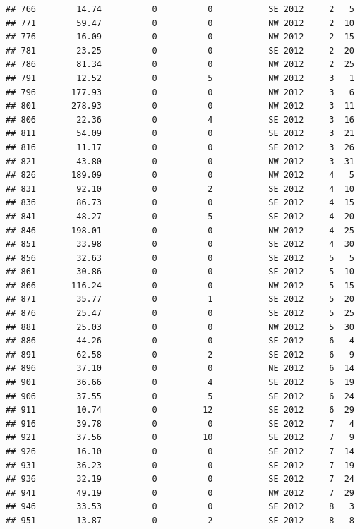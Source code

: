 \documentclass[
]{article}
\begin{document}
\begin{verbatim}
## 766        14.74          0          0           SE 2012     2   5
## 771        59.47          0          0           NW 2012     2  10
## 776        16.09          0          0           NW 2012     2  15
## 781        23.25          0          0           SE 2012     2  20
## 786        81.34          0          0           NW 2012     2  25
## 791        12.52          0          5           NW 2012     3   1
## 796       177.93          0          0           NW 2012     3   6
## 801       278.93          0          0           NW 2012     3  11
## 806        22.36          0          4           SE 2012     3  16
## 811        54.09          0          0           SE 2012     3  21
## 816        11.17          0          0           SE 2012     3  26
## 821        43.80          0          0           NW 2012     3  31
## 826       189.09          0          0           NW 2012     4   5
## 831        92.10          0          2           SE 2012     4  10
## 836        86.73          0          0           SE 2012     4  15
## 841        48.27          0          5           SE 2012     4  20
## 846       198.01          0          0           NW 2012     4  25
## 851        33.98          0          0           SE 2012     4  30
## 856        32.63          0          0           SE 2012     5   5
## 861        30.86          0          0           SE 2012     5  10
## 866       116.24          0          0           NW 2012     5  15
## 871        35.77          0          1           SE 2012     5  20
## 876        25.47          0          0           SE 2012     5  25
## 881        25.03          0          0           NW 2012     5  30
## 886        44.26          0          0           SE 2012     6   4
## 891        62.58          0          2           SE 2012     6   9
## 896        37.10          0          0           NE 2012     6  14
## 901        36.66          0          4           SE 2012     6  19
## 906        37.55          0          5           SE 2012     6  24
## 911        10.74          0         12           SE 2012     6  29
## 916        39.78          0          0           SE 2012     7   4
## 921        37.56          0         10           SE 2012     7   9
## 926        16.10          0          0           SE 2012     7  14
## 931        36.23          0          0           SE 2012     7  19
## 936        32.19          0          0           SE 2012     7  24
## 941        49.19          0          0           NW 2012     7  29
## 946        33.53          0          0           SE 2012     8   3
## 951        13.87          0          2           SE 2012     8   8

\end{verbatim}
\end{document}
